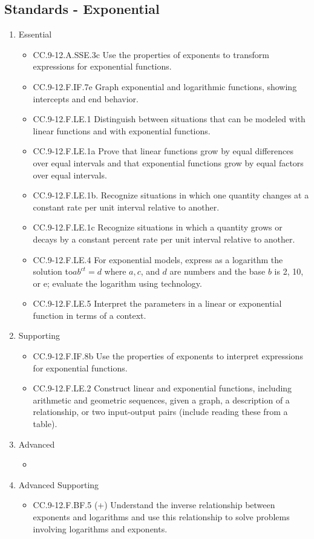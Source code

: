 \documentclass{article}
\begin{document}
\subsection*{Standards - Exponential}
\begin{enumerate}
	\item Essential
	\begin{itemize}
		\item CC.9-12.A.SSE.3c Use the properties of exponents to transform expressions for exponential functions.
		\item CC.9-12.F.IF.7e Graph exponential and logarithmic functions, showing intercepts and end behavior.
		\item CC.9-12.F.LE.1  Distinguish between situations that can be modeled with linear functions and with exponential functions.
		\item CC.9-12.F.LE.1a Prove that linear functions grow by equal differences over equal intervals and that exponential functions grow by equal factors over equal intervals.
		\item CC.9-12.F.LE.1b. Recognize situations in which one quantity changes at a constant rate per unit interval relative to another.
		\item CC.9-12.F.LE.1c Recognize situations in which a quantity grows or decays by a constant percent rate per unit interval relative to another.
		\item CC.9-12.F.LE.4 For exponential models, express as a logarithm the solution to$ ab^{ct} = d$ where $a, c$, and $d$ are numbers and the base $b$ is 2, 10, or e; evaluate the logarithm using technology.
		\item CC.9-12.F.LE.5  Interpret the parameters in a linear or exponential function in terms of a context.
	\end{itemize}		
	\item Supporting
	\begin{itemize}
		\item CC.9-12.F.IF.8b Use the properties of exponents to interpret expressions for exponential functions. 
		\item CC.9-12.F.LE.2  Construct linear and exponential functions, including arithmetic and geometric sequences, given a graph, a description of a relationship, or two input-output pairs (include reading these from a table).
	\end{itemize}
	\item Advanced
	\begin{itemize}
		\item
	\end{itemize}
	\item Advanced Supporting
	\begin{itemize}
		\item CC.9-12.F.BF.5 (+) Understand the inverse relationship between exponents and logarithms and use this relationship to solve problems involving logarithms and exponents.
	\end{itemize}
\end{enumerate}
\newpage
\end{document}
